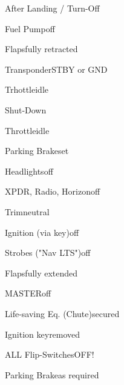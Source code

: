 \begin{checklist}{After Landing / Turn-Off}
	\item{Fuel Pump}{off}
	\item{Flaps}{fully retracted}
	\item{Transponder}{STBY or GND}
	\item{Trhottle}{idle}
\end{checklist}

\begin{checklist}{Shut-Down}
	  \item{Throttle}{idle}
	  \item{Parking Brake}{set}
	  \item{Headlights}{off}
	  \item{XPDR, Radio, Horizon}{off}
	  \item{Trim}{neutral}
	  \item{Ignition (via key)}{off}
	  
	  \item{Strobes ("Nav LTS")}{off}
	  \item{Flaps}{fully extended}
	  \item{MASTER}{off}
	  \item{Life-saving Eq. (Chute)}{secured}
	  \item{Ignition key}{removed}
	  
	  \item{ALL Flip-Switches}{OFF!}
	  \item{Parking Brake}{as required}
\end{checklist}


